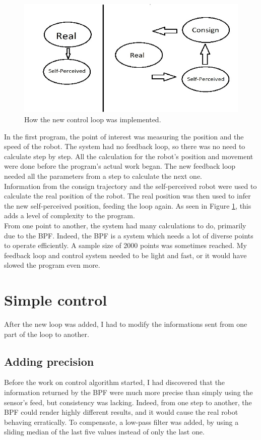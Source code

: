 \begin{figure}[ht]
\centering
\includegraphics{Figures/Loops}
\decoRule
\caption[Direct and controled loops]{How the new control loop was implemented.}
\label{fig:Loops}
\end{figure}

In the first program, the point of interest was measuring the position and the speed of the robot.
The system had no feedback loop, so there was no need to calculate step by step. All the calculation for the robot's position and movement were done before the program's actual work began.
The new feedback loop needed all the parameters from a step to calculate the next one.\\

Information from the consign trajectory and the self-perceived robot were used to calculate the real position of the robot.
The real position was then used to infer the new self-perceived position, feeding the loop again.
As seen in Figure \ref{fig:Loops}, this adds a level of complexity to the program.\\

From one point to another, the system had many calculations to do, primarily due to the BPF.
Indeed, the BPF is a system which needs a lot of diverse points to operate efficiently. A sample size of 2000 points was sometimes reached.
My feedback loop and control system needed to be light and fast, or it would have slowed the program even more.\\


\section{Simple control}
After the new loop was added, I had to modify the informations sent from one part of the loop to another.

\subsection{Adding precision}
Before the work on control algorithm started, I had discovered that the information returned by the BPF were much more precise than simply using the sensor's feed, but consistency was lacking.
Indeed, from one step to another, the BPF could render highly different results, and it would cause the real robot behaving erratically.
To compensate, a low-pass filter was added, by using a sliding median of the last five values instead of only the last one.\\

